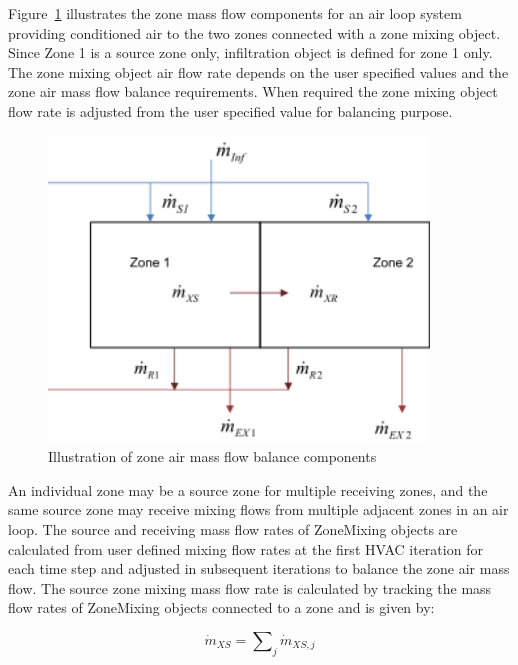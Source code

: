 Figure~\ref{fig:illustration-of-zone-air-mass-flow-balance} illustrates the zone mass flow components for an air loop system providing conditioned air to the two zones connected with a zone mixing object. Since Zone 1 is a source zone only, infiltration object is defined for zone 1 only. The zone mixing object air flow rate depends on the user specified values and the zone air mass flow balance requirements. When required the zone mixing object flow rate is adjusted from the user specified value for balancing purpose.

\begin{figure}[hbtp] %
\centering
\includegraphics[width=0.9\textwidth, height=0.9\textheight, keepaspectratio=true]{media/image134.svg.png}
\caption{Illustration of zone air mass flow balance components \protect \label{fig:illustration-of-zone-air-mass-flow-balance}}
\end{figure}

An individual zone may be a source zone for multiple receiving zones, and the same source zone may receive mixing flows from multiple adjacent zones in an air loop. The source and receiving mass flow rates of ZoneMixing objects are calculated from user defined mixing flow rates at the first HVAC iteration for each time step and adjusted in subsequent iterations to balance the zone air mass flow. The source zone mixing mass flow rate is calculated by tracking the mass flow rates of ZoneMixing objects connected to a zone and is given by:

\begin{equation}
{\dot m_{XS}} = \sum\nolimits_j {{{\dot m}_{XS,j}}}
\end{equation}

